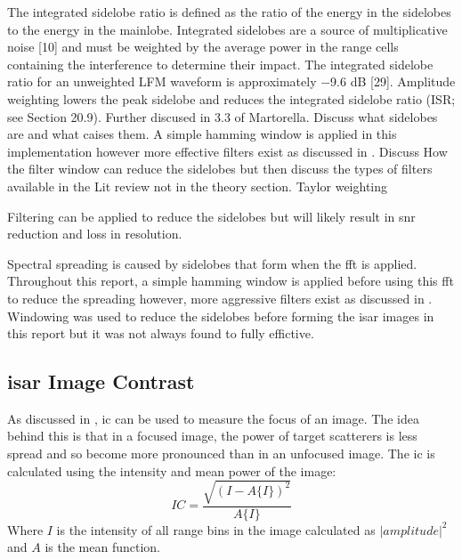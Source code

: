 \documentclass[class=report,11pt,crop=false]{standalone}
\begin{document}
The integrated sidelobe ratio is defined as the ratio of the energy in the sidelobes to the energy in the mainlobe. Integrated sidelobes are a source of multiplicative noise [10] and must be weighted by the average power in the range cells containing the interference to determine their impact. The integrated sidelobe ratio for an unweighted LFM waveform is approximately −9.6 dB [29]. Amplitude weighting lowers the peak sidelobe and reduces the integrated sidelobe ratio (ISR; see Section 20.9). %
Further discused in 3.3 of Martorella.
    Discuss what sidelobes are and what caises them. 
    A simple hamming window is applied in this implementation however more effective filters exist as discussed in \cite{ISARtextbook_Martorella}.
    Discuss How the filter window can reduce the sidelobes but then discuss the types of filters available in the Lit review not in the theory section. Taylor weighting %
    
    Filtering can be applied to reduce the sidelobes but will likely result in snr reduction and loss in resolution. %
    
    Spectral spreading is caused by sidelobes that form when the \gls{fft} is applied. Throughout this report, a simple hamming window is applied before using this \gls{fft} to reduce the spreading however, more aggressive filters exist as discussed in \cite{ISARtextbook_Martorella}. Windowing was used to reduce the sidelobes before forming the \gls{isar} images in this report but it was not always found to fully effictive.
    \subsection{\gls{isar} Image Contrast} %
    As discussed in \cite{image_contrast}, \gls{ic} can be used to measure the focus of an image. The idea behind this is that in a focused image, the power of target scatterers is less spread and so become more pronounced than in an unfocused image. The \gls{ic} is calculated using the intensity and mean power of the image:
    \begin{equation} \label{eq:image_contrast}
    IC = \frac{\sqrt{(I-A\{I\})^2}}{A\{I\}}
    \end{equation}
    Where \(I\) is the intensity of all range bins in the image calculated as \(|amplitude|^2\) and \(A\) is the mean function.
    
\end{document}
